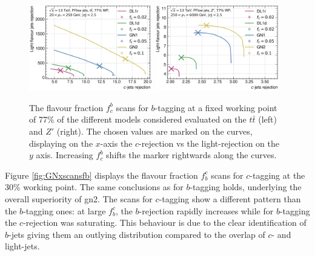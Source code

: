 \begin{figure}[h!]
  \centering
  \includegraphics[width=0.48\textwidth]{Images/FTAG/GN/GN2/fraction_scans/FractionScanPlot_tt.png}
  \includegraphics[width=0.48\textwidth]{Images/FTAG/GN/GN2/fraction_scans/FractionScanPlot_zp.png}
  \caption{The flavour fraction $f^b_c$ scans for $b$-tagging at a fixed working point of 77\% of the different models considered evaluated on the $t\bar{t}$ (left) and $Z'$ (right). The chosen values are marked on the curves, displaying on the $x$-axis the $c$-rejection vs the light-rejection on the $y$ axis. Increasing $f^b_c$ shifts the marker rightwards along the curves. }
  \label{fig:GNxscansfc}
\end{figure} 

Figure \ref{fig:GNxscansfb} displays the flavour fraction $f^c_b$ scans for $c$-tagging at the 30\% working point. The same conclusions as for $b$-tagging holds, underlying the overall superiority of \gls{gn2}. The scans for $c$-tagging show a different pattern than the $b$-tagging ones: at large $f^c_b$, the $b$-rejection rapidly increases while for $b$-tagging the $c$-rejection was saturating. This behaviour is due to the clear identification of $b$-jets giving them an outlying distribution compared to the overlap of $c$- and light-jets. \\

